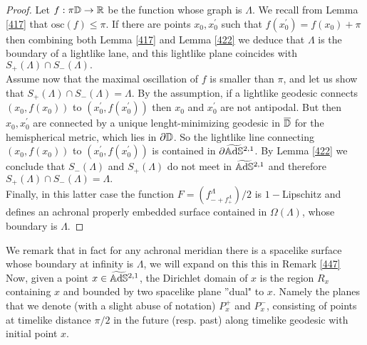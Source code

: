 \begin{proof}
    Let $f:\pi\mathbb{D}\to\mathbb{R}$ be the function whose graph is $\Lambda.$ We recall from Lemma \ref{417} that $\text{osc}(f)\leq\pi$. If there are points $x_0,x_0^{\prime}$ such that $f(x_0^{\prime})=f(x_0)+\pi$ then combining both Lemma \ref{417} and Lemma \ref{422} we deduce that $\Lambda$ is the boundary of a lightlike lane, and this lightlike plane coincides with $S_+(\Lambda)\cap S_-(\Lambda).$\\
    Assume now that the maximal oscillation of $f$ is smaller than $\pi$, and let us show that $S_+(\Lambda)\cap S_-(\Lambda)=\Lambda.$ By the assumption, if a lightlike geodesic connects $(x_0,f(x_0))$ to $(x_0^{\prime} ,f(x_0^{\prime}))$ then $x_0$ and $x_0^{\prime}$ are not antipodal. But then $x_0,x_0^{\prime}$ are connected by a unique lenght-minimizing geodesic in $\overline{\mathbb{D}}$ for the hemispherical metric, which lies in $\partial\mathbb{D}$. So the lightlike line connecting $(x_0,f(x_0))$ to $(x_0^{\prime},f(x_0^{\prime}))$ is contained in $\partial\widetilde{\mathbb{A}\mathrm{d}\mathbb{S}}{}^{2,1}$. By Lemma \ref{422} we conclude that $S_-(\Lambda)$ and $S_+(\Lambda)$ do not meet in $\widetilde{\mathbb{A}\mathrm{d}\mathbb{S}}{}^{2,1}$ and therefore $S_+(\Lambda)\cap S_-(\Lambda)=\Lambda.$\\
    Finally, in this latter case the function $F=(f^\Lambda_{-+f^\Lambda_+})/2$ is $1-$Lipschitz and defines an achronal properly embedded surface contained in $\Omega(\Lambda)$, whose boundary is $\Lambda$. 
\end{proof}

We remark that in fact for any achronal meridian there is a spacelike surface whose boundary at infinity is $\Lambda$, we will expand on this this in Remark \ref{447}
Now, given a point $x \in \widetilde{\mathbb{A}\mathrm{d}\mathbb{S}}{}^{2,1}$, the Dirichlet domain of $x$ is the region $R_x$ containing $x$ and bounded by two spacelike plane ''dual" to $x$. Namely the planes that we denote (with a slight abuse of notation) $P_x^+$ and $P_x^-$, consisting of points at timelike distance $\pi/2$ in the future (resp. past) along timelike geodesic with initial point $x$.

